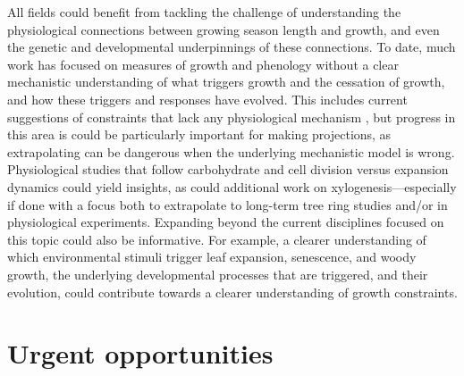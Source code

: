 \documentclass[11pt]{article}
\begin{document}
All fields could benefit from tackling the challenge of understanding the physiological connections between growing season length and growth, and even the genetic and developmental underpinnings of these connections. To date, much work has focused on measures of growth and phenology without a clear mechanistic understanding of what triggers growth and the cessation of growth, and how these triggers and responses have evolved. This includes current suggestions of constraints that lack any physiological mechanism%
, but progress in this area is could be particularly important for making projections, as extrapolating can be dangerous when the underlying mechanistic model is wrong. Physiological studies that follow carbohydrate and cell division versus expansion dynamics could yield insights, as could additional work on xylogenesis---especially if done with a focus both to extrapolate to long-term tree ring studies and/or in physiological experiments. Expanding beyond the current disciplines focused on this topic could also be informative. For example, a clearer understanding of which environmental stimuli trigger leaf expansion, senescence, and woody growth, the underlying developmental processes that are triggered, and their evolution, could contribute towards a clearer understanding of growth constraints. 


\section*{Urgent opportunities}

\end{document}
